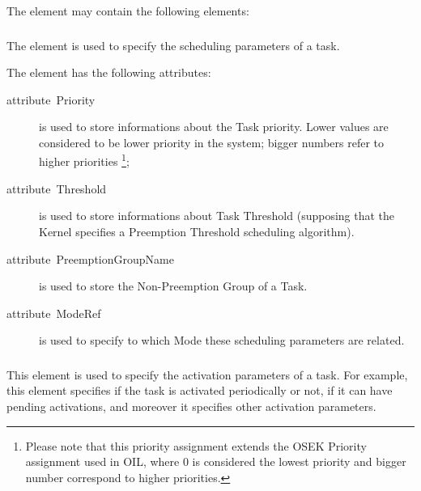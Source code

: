 The  element may contain the following elements:


\subsubsection{}

The  element is used to specify the scheduling
parameters of a task.

The  element has the following attributes:

\begin{description}
\item [{attribute~Priority}] is used to store informations about the
  Task priority. Lower values are considered to be lower priority in
  the system; bigger numbers refer to higher priorities
  \footnote{Please note that this priority assignment extends the OSEK
    Priority assignment used in OIL, where 0 is considered the lowest
    priority and bigger number correspond to higher priorities.};
\item [{attribute~Threshold}] is used to store informations about Task
  Threshold (supposing that the Kernel specifies a Preemption
  Threshold scheduling algorithm).
\item [{attribute~PreemptionGroupName}] is used to store the
  Non-Preemption Group of a Task. 
\item [{attribute~ModeRef}] is used to specify to which Mode these scheduling
  parameters are related.
\end{description}


\subsubsection{}

This element is used to specify the activation parameters of a task.
For example, this element specifies if the task is activated
periodically or not, if it can have pending activations, and moreover
it specifies other activation parameters.

